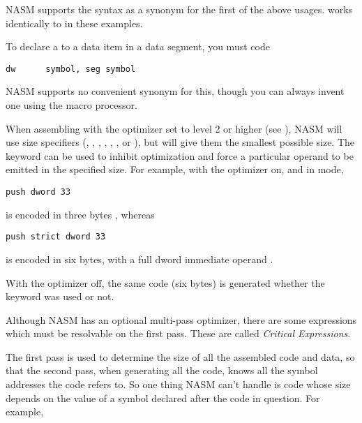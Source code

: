 NASM supports the syntax 
as a synonym for the first of the above usages.  works
identically to  in these examples.

To declare a  to a data item in a data
segment, you must code

\begin{lstlisting}
dw      symbol, seg symbol
\end{lstlisting}

NASM supports no convenient synonym for this, though you can always
invent one using the macro processor.


When assembling with the optimizer set to level 2 or higher (see
), NASM will use size specifiers (,
, , , , ,
 or ), but will give them the smallest possible
size. The keyword  can be used to inhibit optimization
and force a particular operand to be emitted in the specified size.
For example, with the optimizer on, and in  mode,

\begin{lstlisting}
push dword 33
\end{lstlisting}

is encoded in three bytes , whereas

\begin{lstlisting}
push strict dword 33
\end{lstlisting}

is encoded in six bytes, with a full dword immediate operand
.

With the optimizer off, the same code (six bytes) is generated whether
the  keyword was used or not.


Although NASM has an optional multi-pass optimizer, there are some
expressions which must be resolvable on the first pass. These are
called \emph{Critical Expressions}.

The first pass is used to determine the size of all the assembled
code and data, so that the second pass, when generating all the
code, knows all the symbol addresses the code refers to. So one
thing NASM can't handle is code whose size depends on the value
of a symbol declared after the code in question. For example,

